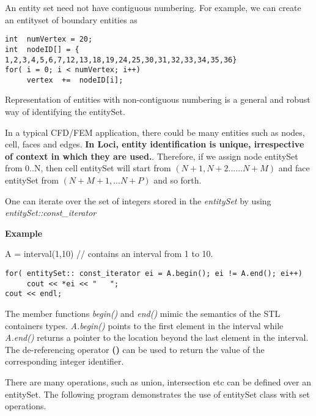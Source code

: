 An entity set need not have contiguous numbering. For example, we can create an entityset
of boundary entities as

\begin{verbatim}
int  numVertex = 20;
int  nodeID[] = { 1,2,3,4,5,6,7,12,13,18,19,24,25,30,31,32,33,34,35,36}
for( i = 0; i < numVertex; i++)
     vertex  +=  nodeID[i];
\end{verbatim}

Representation of entities with non-contiguous numbering is a general and robust 
way of identifying the entitySet.

\par In a typical CFD/FEM application, there could be many entities such as nodes, cell, 
faces and edges.  {\bf In Loci, entity identification is unique, irrespective
of context in which they are used.}. Therefore, if we assign node entitySet from 0..N,
then cell entitySet will start from $(N+1, N+2......N+M)$ and face entitySet from $(N+M+1,...N+P)$
and so forth.

\par One can iterate over the set of integers stored in the {\em entitySet} by 
using {\em entitySet::const\_iterator}
\par {\bf Example}
\par A = interval(1,10)       // contains an interval from 1 to 10.
\begin{verbatim}
for( entitySet:: const_iterator ei = A.begin(); ei != A.end(); ei++)
     cout << *ei << "   ";
cout << endl;
\end{verbatim}
The member functions {\em begin()} and {\em end()} mimic the semantics of the STL
containers types. {\em A.begin()} points to the first element in the interval while
{\em A.end()} returns a pointer to the location beyond the last element in the 
interval. The de-referencing operator {\bf *()} can be used to return the value of 
the corresponding integer identifier. 

\par There are many operations, such as union, intersection etc can be defined 
over an entitySet. The following program demonstrates the use of entitySet class 
with set operations.

